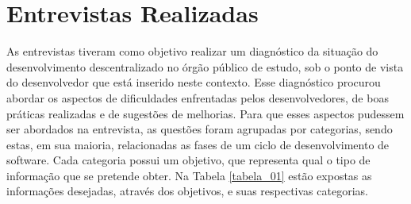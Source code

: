 \section{Entrevistas Realizadas}
As entrevistas tiveram como objetivo realizar um diagnóstico da situação do desenvolvimento descentralizado no órgão público de estudo, sob o ponto de vista do desenvolvedor que está inserido neste contexto. Esse diagnóstico procurou abordar os aspectos de dificuldades enfrentadas pelos desenvolvedores, de boas práticas realizadas e de sugestões de melhorias. Para que esses aspectos pudessem ser abordados na entrevista, as questões foram agrupadas por categorias, sendo estas, em sua maioria, relacionadas as fases de um ciclo de desenvolvimento de software. Cada categoria possui um objetivo, que representa qual o tipo de informação que se pretende obter. Na Tabela \ref{tabela_01} estão expostas as informações desejadas, através dos objetivos, e suas respectivas categorias. \clearpage

